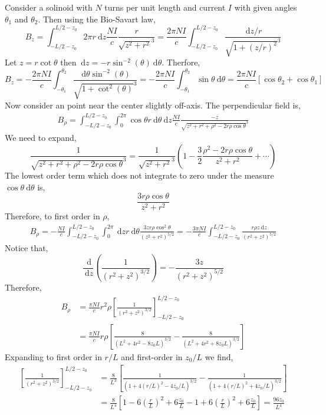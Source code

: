 \documentclass[12pt]{extarticle}
\renewcommand{\d}[1]{\: \mathrm{d}#1}
\newcommand{\deriv}[2]{\frac{\d{#1}}{\d{#2}}}
\theoremstyle{definition}
\begin{document}
Consider a solinoid with $N$ turns per unit length and current $I$ with given angles $\theta_1$ and $\theta_2$. Then using the Bio-Savart law,
\[ B_z = \int_{-L/2-z_0}^{L/2-z_0} 2 \pi r \d{z} \frac{NI}{c} \frac{r}{\sqrt{z^2 + r^2}^3} = \frac{2 \pi N I}{c} \int_{- L/2 - z_0}^{L/2 - z_0}  \frac{\d{z}/r}{\sqrt{1 + (z/r)^2}^3} \]
Let $z = r \cot{\theta}$ then $\d{z} = -r \sin^{-2}(\theta) \d{\theta}$. Therfore,
\[ B_z = - \frac{2 \pi NI}{c} \int_{-\theta_1}^{\theta_2} \frac{\d{\theta} \sin^{-2}(\theta)}{\sqrt{1 + \cot^2{(\theta)}}^3} =- \frac{2 \pi N I}{c} \int_{-\theta_1}^{\theta_2} \sin{\theta} \d{\theta} = \frac{2 \pi N I}{c} \left[ \cos{\theta_2} + \cos{\theta_1} \right] \] 
Now consider an point near the center slightly off-axis. The perpendicular field is,
\begin{align*}
B_\rho = \int_{-L/2-z_0}^{L/2-z_0} \int_0^{2 \pi} \cos{\theta} r \d{\theta}  \d{z} \frac{NI}{c} \frac{-z}{\sqrt{z^2 + r^2 + \rho^2 - 2 r \rho \cos{\theta}}^3}
\end{align*} 
We need to expand,
\[ \frac{1}{\sqrt{z^2 + r^2 + \rho^2 - 2 r \rho \cos{\theta}}^3} = \frac{1}{\sqrt{z^2 + r^2}^3} \left( 1 - \frac{3}{2} \frac{\rho^2 - 2 r \rho \cos{\theta}}{z^2 + r^2} + \cdots \right) \]
The lowest order term which does not integrate to zero under the measure $\cos{\theta} \d{\theta}$ is,
\[ \frac{3 r \rho \cos{\theta}}{z^2 + r^2} \]
Therefore, to first order in $\rho$,
\begin{align*}
B_\rho = - \frac{NI}{c} \int_{-L/2-z_0}^{L/2-z_0} \int_0^{2 \pi} \d{z} r \d{\theta} \frac{3 z r \rho \cos^2{\theta}}{(z^2 + r^2)^{5/2}} = - \frac{3 \pi N I}{c} \int_{-L/2 - z_0}^{L/2 - z_0} \frac{r \rho  z \d{z}}{(r^2 + z^2)^{5/2}} 
\end{align*}
Notice that,
\[ \deriv{}{z} \left( \frac{1}{(r^2 + z^2)^{3/2}}  \right) = - \frac{3 z}{(r^2 + z^2)^{5/2}} \]
Therefore,
\begin{align*}
B_{\rho} & = \frac{\pi NI}{c} r^2 \rho \left[ \frac{1}{(r^2 + z^2)^{3/2}}  \right]_{-L/2 - z_0}^{L/2 - z_0}
\\
& = \frac{\pi NI}{c} r \rho \left[ \frac{8}{(L^2 + 4 r^2 - 8 z_0 L)^{3/2}} - \frac{8}{(L^2 + 4 r^2 + 8 z_0 L)^{3/2}}  \right]
\end{align*}
Expanding to first order in $r / L$ and first-order in $z_0 / L$ we find,
\begin{align*}
\left[ \frac{1}{(r^2 + z^2)^{3/2}}  \right]_{-L/2 - z_0}^{L/2 - z_0} & = \frac{8}{L^3} \left[ \frac{1}{(1 + 4 (r/L)^2 - 4 z_0 / L)^{3/2}} - \frac{1}{(1 + 4 (r/L)^2 + 4 z_0 / L)^{3/2}} \right]
\\
& = \frac{8}{L^4} \left[ 1 - 6 \left( \frac{r}{L} \right)^2 + 6 \frac{z_0}{L} - 1 + 6 \left( \frac{r}{L} \right)^2 + 6 \frac{z_0}{L} \right] = \frac{96 z_0}{L^4} 
\end{align*}
\end{document}

